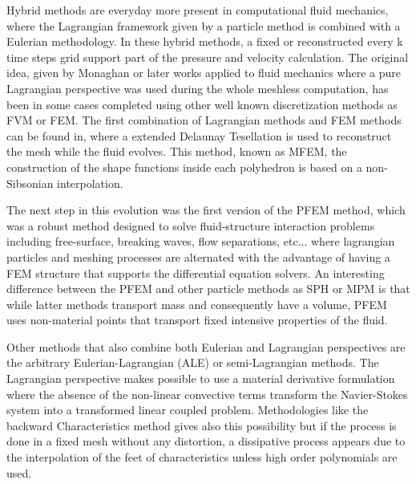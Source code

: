 
Hybrid methods are everyday more present in computational fluid mechanics, where the Lagrangian framework given by a particle method is combined with a Eulerian methodology. In these hybrid methods, a fixed or reconstructed every k time steps grid support part of the pressure and velocity calculation. The original idea, given by Monaghan \cite{Mon77} or later works applied to fluid mechanics \cite{Monaghan88} where a pure Lagrangian perspective was used during the whole meshless computation, has been in some cases completed using other well known discretization methods as FVM\cite{Nestor20091733} or FEM\cite{Ide03}. The first combination of Lagrangian methods and FEM methods can be found in\cite{Ide03b}, where a extended Delaunay Tesellation is used to reconstruct the mesh while the fluid evolves. This method, known as MFEM, the construction of the shape functions inside each polyhedron is based on a non-Sibsonian interpolation.

The next step in this evolution was the first version of the PFEM method\cite{Idelsohn04}, which was a robust method designed to solve fluid-structure interaction problems including free-surface, breaking waves, flow separations, etc... where lagrangian particles and meshing processes are alternated with the advantage of having a FEM structure that supports the differential equation solvers. An interesting difference between the PFEM and other particle methods as SPH or MPM\cite{Wieckowsky04} is that while latter methods transport mass and consequently have a volume, PFEM uses non-material points that transport fixed intensive properties of the fluid.

Other methods that also combine both Eulerian and Lagrangian perspectives are the arbitrary Eulerian-Lagrangian (ALE)\cite{Donea83} or semi-Lagrangian methods\cite{Bermejo}. The Lagrangian perspective makes possible to use a material derivative formulation where the absence of the non-linear convective terms transform the Navier-Stokes system into a transformed linear coupled problem. Methodologies like the backward Characteristics method\cite{Bermejo} gives also this possibility but if the process is done in a fixed mesh without any distortion, a dissipative process appears due to the interpolation of the feet of characteristics unless high order polynomials are used.

